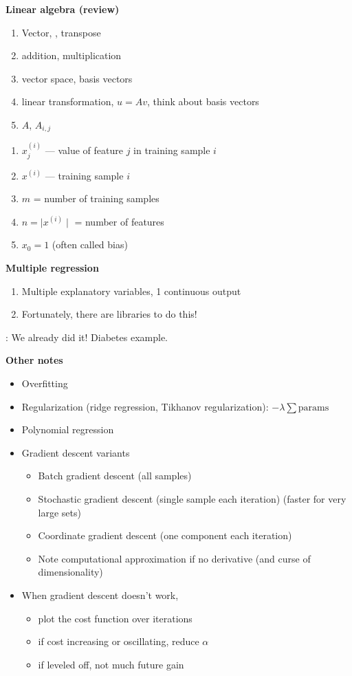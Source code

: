 \textbf{Linear algebra (review)}
\begin{enumerate}
\item Vector, , transpose
\item addition, multiplication
\item vector space, basis vectors
\item linear transformation, $u=Av$, think about basis vectors
\item $A$, $A_{i,j}$
\end{enumerate}

\begin{enumerate}
\item $x_j^{(i)}$ --- value of feature $j$ in training sample $i$
\item $x^{(i)}$ --- training sample $i$
\item $m$ = number of training samples
\item $n = \mid x^{(i)} \mid$ = number of features
\item $x_0 = 1$ (often called bias)
\end{enumerate}

\textbf{Multiple regression}
\begin{enumerate}
\item Multiple explanatory variables, 1 continuous output
\item Fortunately, there are libraries to do this!
\end{enumerate}

 : We already did it!  Diabetes example.

\textbf{Other notes}
\begin{itemize}
\item Overfitting
\item Regularization (ridge regression, Tikhanov regularization): $-\lambda\sum \mbox{params}$
\item Polynomial regression
\item Gradient descent variants
  \begin{itemize}
  \item Batch gradient descent (all samples)
  \item Stochastic gradient descent (single sample each iteration) (faster for very large sets)
  \item Coordinate gradient descent (one component each iteration)
  \item Note computational approximation if no derivative (and curse of dimensionality)
  \end{itemize}
\item When gradient descent doesn't work,
  \begin{itemize}
  \item plot the cost function over iterations
  \item if cost increasing or oscillating, reduce $\alpha$
  \item if leveled off, not much future gain
  \end{itemize}

\end{itemize}



